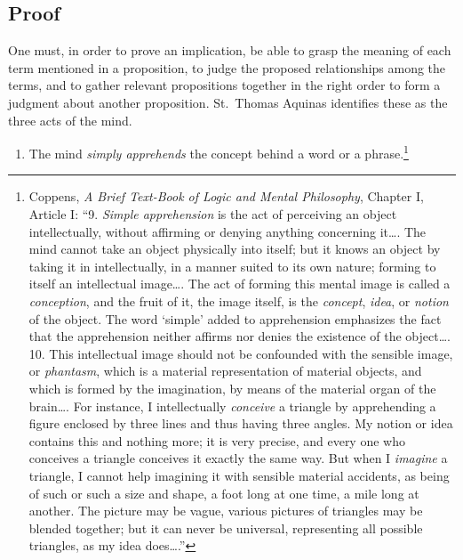 \subsection{Proof}

One must, in order to prove an implication, be able to grasp the meaning of
each term mentioned in a proposition, to judge the proposed relationships among
the terms, and to gather relevant propositions together in the right order to
form a judgment about another proposition.  St.~Thomas Aquinas identifies these
as the three acts of the mind.
\begin{enumerate}
   \item The mind \emph{simply apprehends} the concept behind a word or a
      phrase.\footnote{%
         Coppens, {\it A Brief Text-Book of Logic and Mental Philosophy},
         Chapter I, Article I\@: ``9. \emph{Simple apprehension} is the act of
         perceiving an object intellectually, without affirming or denying
         anything concerning it\ldots. The mind cannot take an object
         physically into itself; but it knows an object by taking it in
         intellectually, in a manner suited to its own nature; forming to
         itself an intellectual image\ldots.  The act of forming this mental
         image is called a \emph{conception}, and the fruit of it, the image
         itself, is the \emph{concept}, \emph{idea}, or \emph{notion} of the
         object.  The word `simple' added to apprehension emphasizes the fact
         that the apprehension neither affirms nor denies the existence of the
         object\ldots.  10. This intellectual image should not be confounded
         with the sensible image, or \emph{phantasm}, which is a material
         representation of material objects, and which is formed by the
         imagination, by means of the material organ of the brain\ldots.  For
         instance, I intellectually \emph{conceive} a triangle by apprehending
         a figure enclosed by three lines and thus having three angles. My
         notion or idea contains this and nothing more; it is very precise, and
         every one who conceives a triangle conceives it exactly the same way.
         But when I \emph{imagine} a triangle, I cannot help imagining it with
         sensible material accidents, as being of such or such a size and
         shape, a foot long at one time, a mile long at another. The picture
         may be vague, various pictures of triangles may be blended together;
         but it can never be universal, representing all possible triangles, as
         my idea does\ldots.''%
}
\end{enumerate}
